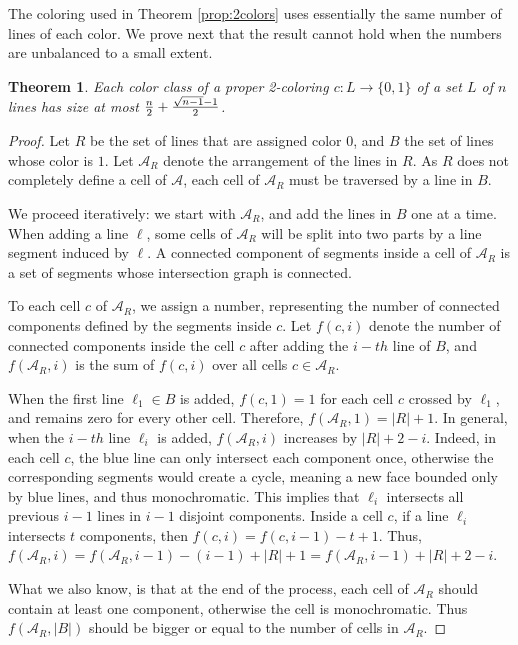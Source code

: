 \documentclass[11pt,a4paper]{article}
\newtheorem{theorem}{Theorem}
\begin{document}
The coloring used in Theorem \ref{prop:2colors} uses essentially the same number of lines of each color. We prove next that the result cannot hold when the numbers are unbalanced to a small extent.

\begin{theorem}
Each color class of a proper 2-coloring $c:L\rightarrow \{0,1\}$ of a set $L$ of $n$ lines has size at most ${n\over 2} + {\sqrt{n-1}-1\over 2}$.
\end{theorem}
\begin{proof}
Let $R$ be the set of lines that are assigned color $0$, and $B$ the set of lines whose color is $1$. Let $\mathcal{A}_{R}$ denote the arrangement of the lines in $R$. As $R$ does not completely define a cell of $\mathcal A$, each cell of $\mathcal{A}_{R}$ must be traversed by a line in $B$.

We proceed iteratively: we start with $\mathcal{A}_{R}$, and add the lines in $B$ one at a time. When adding a line $\ell$, some cells of $\mathcal{A}_{R}$ will be split into two parts by a line segment induced by $\ell$. A connected component of segments inside a cell of $\mathcal{A}_{R}$ is a set of segments whose intersection graph is connected.

To each cell $c$ of $\mathcal{A}_{R}$, we assign a number, representing the number of connected components defined by the segments inside $c$. Let $f(c,i)$ denote the number of connected components inside the cell $c$ after adding the $i-{th}$ line of $B$, and $f(\mathcal{A}_{R},i)$ is the sum of $f(c,i)$ over all cells $c \in \mathcal{A}_{R}$.

When the first line $\ell_{1} \in B$ is added, $f(c,1)=1$ for each cell $c$ crossed by $\ell_{1}$, and remains zero for every other cell. Therefore, $f(\mathcal{A}_{R},1)=|R|+1$. In general, when the $i-{th}$ line $\ell_{i}$ is added, $f(\mathcal {A}_{R},i)$ increases by $|R|+2-i$. Indeed, in each cell $c$, the blue line can only intersect each component once, otherwise the corresponding segments would create a cycle, meaning a new face bounded only by blue lines, and thus monochromatic. This implies that $\ell_{i}$ intersects all previous $i-1$ lines in $i-1$ disjoint components. Inside a cell $c$, if a line $\ell_{i}$ intersects $t$ components, then $f(c,i)= f(c,i-1)-t +1$. Thus, $f(\mathcal {A}_{R},i)= f(\mathcal {A}_{R},i-1)- (i-1) + |R|+1=  f(\mathcal {A}_{R},i-1)+ |R|+2 -i$.

What we also know, is that at the end of the process, each cell of $\mathcal {A}_{R}$ should contain at least one component, otherwise the cell is monochromatic. Thus $f(\mathcal {A}_{R},|B|)$ should be bigger or equal to the number of cells in $\mathcal {A}_{R}$.


\end{proof}
\end{document}
